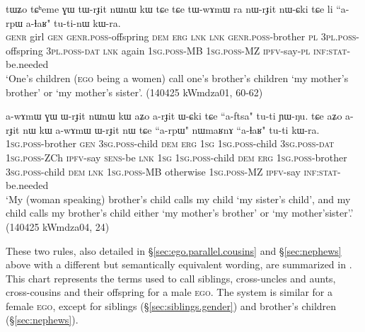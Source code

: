  \begin{exe}
\ex \label{ex:MBCh.2}
\gll tɯʑo tɕʰeme ɣɯ tɯ-rɟit nɯnɯ kɯ tɕe tɕe tɯ-wɤmɯ ra nɯ-rɟit nɯ-ɕki tɕe li ``a-rpɯ a-ɬaʁ"  tu-ti-nɯ kɯ-ra. \\
\textsc{genr} girl \textsc{gen} \textsc{genr}.\textsc{poss}-offspring \textsc{dem} \textsc{erg} \textsc{lnk} \textsc{lnk} \textsc{genr}.\textsc{poss}-brother \textsc{pl}  \textsc{3pl}.\textsc{poss}-offspring  \textsc{3pl}.\textsc{poss}-\textsc{dat} \textsc{lnk} again \textsc{1sg}.\textsc{poss}-MB \textsc{1sg}.\textsc{poss}-MZ \textsc{ipfv}-say-\textsc{pl} \textsc{inf}:\textsc{stat}-be.needed \\
\glt `One's children (\textsc{ego} being a women) call one's brother's children  `my mother's brother' or  `my mother's sister'. (140425 kWmdza01, 60-62)
\end{exe}

\begin{exe}
\ex \label{ex:FZCh.2}
\gll a-wɤmɯ ɣɯ ɯ-rɟit nɯnɯ kɯ aʑo a-rɟit ɯ-ɕki tɕe ``a-ftsa" tu-ti ɲɯ-ŋu.  tɕe aʑo a-rɟit nɯ kɯ a-wɤmɯ ɯ-rɟit nɯ tɕe ``a-rpɯ" nɯmaʁnɤ ``a-ɬaʁ" tu-ti kɯ-ra. \\
\textsc{1sg}.\textsc{poss}-brother \textsc{gen} \textsc{3sg}.\textsc{poss}-child \textsc{dem} \textsc{erg} \textsc{1sg} \textsc{1sg}.\textsc{poss}-child \textsc{3sg}.\textsc{poss}-\textsc{dat} \textsc{1sg}.\textsc{poss}-ZCh \textsc{ipfv}-say \textsc{sens}-be  \textsc{lnk} \textsc{1sg} \textsc{1sg}.\textsc{poss}-child \textsc{dem} \textsc{erg} \textsc{1sg}.\textsc{poss}-brother \textsc{3sg}.\textsc{poss}-child \textsc{dem} \textsc{lnk} \textsc{1sg}.\textsc{poss}-MB otherwise \textsc{1sg}.\textsc{poss}-MZ \textsc{ipfv}-say \textsc{inf}:\textsc{stat}-be.needed  \\
\glt `My (woman speaking) brother's child calls my child  `my sister's child', and my child  calls my brother's child either  `my mother's brother' or  `my mother'sister'.'  (140425 kWmdza04, 24)
\end{exe}

These two rules, also detailed in §\ref{sec:ego.parallel.cousins} and §\ref{sec:nephews} above with a different but semantically equivalent wording, are summarized in . This chart represents the terms used to call siblings, cross-uncles and aunts, cross-cousins and their offspring for a male \textsc{ego}. The system is similar for a female \textsc{ego}, except for  siblings (§\ref{sec:siblings.gender}) and brother's children (§\ref{sec:nephews}).

